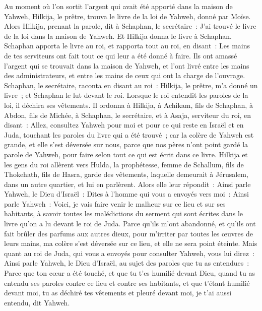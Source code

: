 \begin{multicols}{2}
Au moment où l'on sortit l'argent qui avait été apporté dans la maison de Yahweh, Hilkija, le prêtre, trouva le livre de la loi de Yahweh, donné par Moïse.
Alors Hilkija, prenant la parole, dit à Schaphan, le secrétaire~: J'ai trouvé le livre de la loi dans la maison de Yahweh. Et Hilkija donna le livre à Schaphan.
Schaphan apporta le livre au roi, et rapporta tout au roi, en disant~: Les mains de tes serviteurs ont fait tout ce qui leur a été donné à faire.
Ils ont amassé l'argent qui se trouvait dans la maison de Yahweh, et l'ont livré entre les mains des administrateurs, et entre les mains de ceux qui ont la charge de l'ouvrage.
Schaphan, le secrétaire, raconta en disant au roi~: Hilkija, le prêtre, m'a donné un livre~; et Schaphan le lut devant le roi.
Lorsque le roi entendit les paroles de la loi, il déchira ses vêtements.
Il ordonna à Hilkija, à Achikam, fils de Schaphan, à Abdon, fils de Michée, à Schaphan, le secrétaire, et à Asaja, serviteur du roi, en disant~:
Allez, consultez Yahweh pour moi et pour ce qui reste en Israël et en Juda, touchant les paroles du livre qui a été trouvé~; car la colère de Yahweh est grande, et elle s'est déversée sur nous, parce que nos pères n'ont point gardé la parole de Yahweh, pour faire selon tout ce qui est écrit dans ce livre.
Hilkija et les gens du roi allèrent vers Hulda, la prophétesse, femme de Schallum, fils de Thokehath, fils de Hasra, garde des vêtements, laquelle demeurait à Jérusalem, dans un autre quartier, et lui en parlèrent.
Alors elle leur répondit~: Ainsi parle Yahweh, le Dieu d'Israël~: Dites à l'homme qui vous a envoyés vers moi~:
Ainsi parle Yahweh~: Voici, je vais faire venir le malheur sur ce lieu et sur ses habitants, à savoir toutes les malédictions du serment qui sont écrites dans le livre qu'on a lu devant le roi de Juda.
Parce qu'ils m'ont abandonné, et qu'ils ont fait brûler des parfums aux autres dieux, pour m'irriter par toutes les œuvres de leurs mains, ma colère s'est déversée sur ce lieu, et elle ne sera point éteinte.
Mais quant au roi de Juda, qui vous a envoyés pour consulter Yahweh, vous lui direz~: Ainsi parle Yahweh, le Dieu d'Israël, au sujet des paroles que tu as entendues~:
Parce que ton cœur a été touché, et que tu t'es humilié devant Dieu, quand tu as entendu ses paroles contre ce lieu et contre ses habitants, et que t'étant humilié devant moi, tu as déchiré tes vêtements et pleuré devant moi, je t'ai aussi entendu, dit Yahweh.

\end{multicols}
